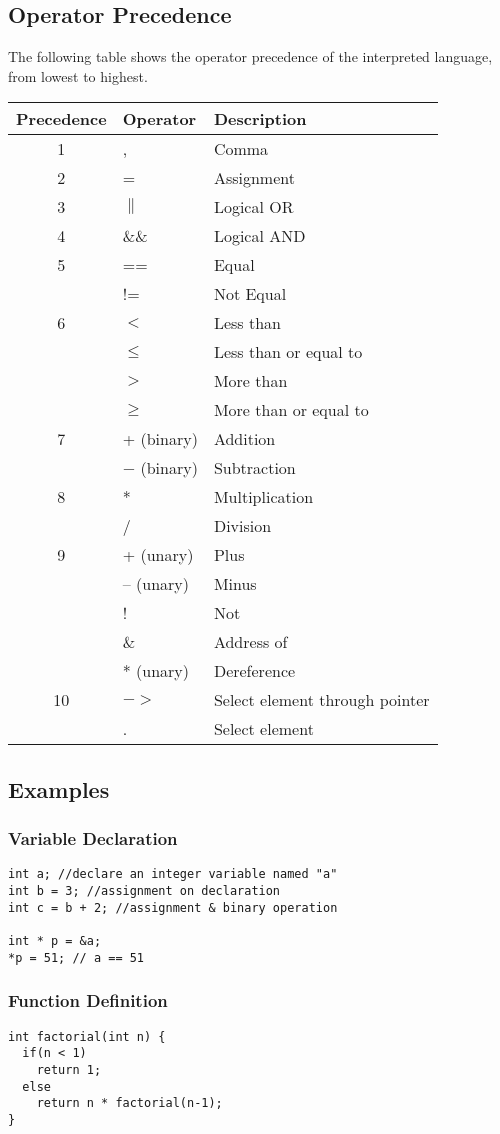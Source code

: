 \documentclass{article}
\begin{document}
\subsection{Operator Precedence}
The following table shows the operator precedence of the interpreted language, from lowest to highest.
\begin{tabular}{| c | l | l |}
\hline
Precedence & Operator & Description \\ \hline
1 & , & Comma \\ \hline
2 & = & Assignment \\ \hline
3 & $\parallel$ & Logical OR \\ \hline
4 & \&\& & Logical AND \\ \hline
5 & == & Equal \\
  & != & Not Equal \\ \hline
6 & $<$ & Less than \\
  & $\leq$ & Less than or equal to \\
  & $>$ & More than \\
  & $\geq$ & More than or equal to \\ \hline
7 & + (binary) & Addition \\
  & $-$ (binary) & Subtraction \\ \hline
8 & * & Multiplication \\
  & / & Division \\ \hline
9 & + (unary) & Plus \\
  & -- (unary) & Minus \\
  & ! & Not \\
  & $\&$ & Address of \\
  & * (unary) & Dereference \\ \hline
10 & $-$$>$ & Select element through pointer \\
   & . & Select element \\ \hline

\end{tabular}

\subsection{Examples}

\subsubsection{Variable Declaration}

\begin{lstlisting}
int a; //declare an integer variable named "a"
int b = 3; //assignment on declaration
int c = b + 2; //assignment & binary operation

int * p = &a;
*p = 51; // a == 51
\end{lstlisting}

\subsubsection{Function Definition}

\begin{lstlisting}
int factorial(int n) {
  if(n < 1)
    return 1;
  else
    return n * factorial(n-1);
}
\end{lstlisting}
\end{document}
